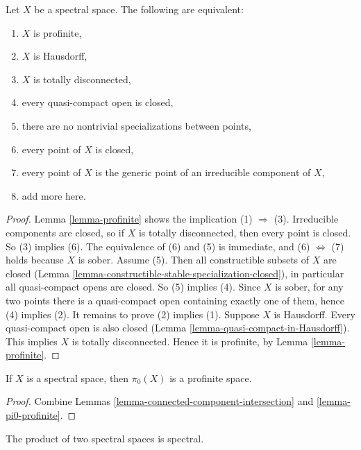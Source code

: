 \begin{lemma}
\label{lemma-characterize-profinite-spectral}
Let $X$ be a spectral space. The following are equivalent:
\begin{enumerate}
\item $X$ is profinite,
\item $X$ is Hausdorff,
\item $X$ is totally disconnected,
\item every quasi-compact open is closed,
\item there are no nontrivial specializations between points,
\item every point of $X$ is closed,
\item every point of $X$ is the generic point of an irreducible component
of $X$,
\item add more here.
\end{enumerate}
\end{lemma}

\begin{proof}
Lemma \ref{lemma-profinite} shows the implication (1) $\Rightarrow$ (3).
Irreducible components are closed, so if $X$ is totally disconnected, then
every point is closed. So (3) implies (6). The equivalence of (6) and (5)
is immediate, and (6) $\Leftrightarrow$ (7) holds because $X$ is sober.
Assume (5). Then all constructible subsets of $X$ are closed
(Lemma \ref{lemma-constructible-stable-specialization-closed}), in
particular all quasi-compact opens are closed. So (5) implies (4).
Since $X$ is sober, for any two points there is a quasi-compact open
containing exactly one of them, hence (4) implies (2). 
It remains to prove (2) implies (1). Suppose $X$ is Hausdorff. Every
quasi-compact open is also closed
(Lemma \ref{lemma-quasi-compact-in-Hausdorff}). This implies $X$
is totally disconnected. Hence it is profinite, by
Lemma \ref{lemma-profinite}.
\end{proof}

\begin{lemma}
\label{lemma-spectral-pi0}
If $X$ is a spectral space, then $\pi_0(X)$ is a profinite space.
\end{lemma}

\begin{proof}
Combine Lemmas \ref{lemma-connected-component-intersection} and
\ref{lemma-pi0-profinite}.
\end{proof}

\begin{lemma}
\label{lemma-product-spectral-spaces}
The product of two spectral spaces is spectral.
\end{lemma}

